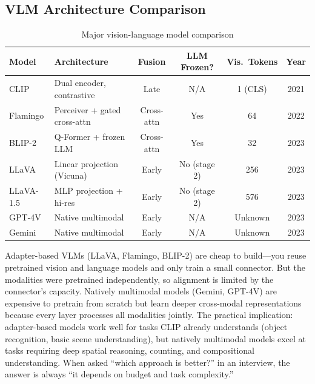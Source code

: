 \subsection{VLM Architecture Comparison}

\begin{table}[H]
\centering
\caption{Major vision-language model comparison}
\begin{tabularx}{\textwidth}{lXcccc}
\toprule
\textbf{Model} & \textbf{Architecture} & \textbf{Fusion} & \textbf{LLM Frozen?} & \textbf{Vis.\ Tokens} & \textbf{Year} \\
\midrule
CLIP & Dual encoder, contrastive & Late & N/A & 1 (CLS) & 2021 \\
Flamingo & Perceiver + gated cross-attn & Cross-attn & Yes & 64 & 2022 \\
BLIP-2 & Q-Former + frozen LLM & Cross-attn & Yes & 32 & 2023 \\
LLaVA & Linear projection (Vicuna) & Early & No (stage 2) & 256 & 2023 \\
LLaVA-1.5 & MLP projection + hi-res & Early & No (stage 2) & 576 & 2023 \\
GPT-4V & Native multimodal & Early & N/A & Unknown & 2023 \\
Gemini & Native multimodal & Early & N/A & Unknown & 2023 \\
\bottomrule
\end{tabularx}
\end{table}

\begin{keyinsight}
Adapter-based VLMs (LLaVA, Flamingo, BLIP-2) are cheap to build---you reuse pretrained vision and language models and only train a small connector. But the modalities were pretrained independently, so alignment is limited by the connector's capacity. Natively multimodal models (Gemini, GPT-4V) are expensive to pretrain from scratch but learn deeper cross-modal representations because every layer processes all modalities jointly. The practical implication: adapter-based models work well for tasks CLIP already understands (object recognition, basic scene understanding), but natively multimodal models excel at tasks requiring deep spatial reasoning, counting, and compositional understanding. When asked ``which approach is better?'' in an interview, the answer is always ``it depends on budget and task complexity.''
\end{keyinsight}

